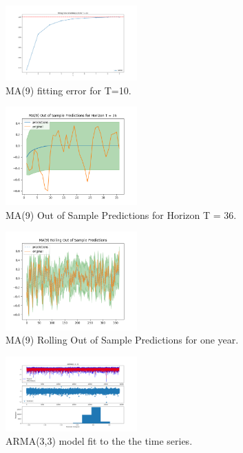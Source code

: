 \documentclass[conference]{IEEEtran}
\begin{document}
\begin{figure}[ht]
    \centering
    \includegraphics[width=0.45\textwidth]{Figures/Fitting Error of ARIMA(0,0,9) for T = 10.png}
    \caption{MA(9) fitting error for T=10.}
    \label{fe9}
\end{figure}

\begin{figure}[ht]
    \centering
    \includegraphics[width=0.45\textwidth]{Figures/MA(9) Out of Sample Predictions for Horizon T = 36.png}
    \caption{MA(9) Out of Sample Predictions for Horizon T = 36.}
    \label{hor9}
\end{figure}
\vspace{40mm}

\begin{figure}[ht]
    \centering
    \includegraphics[width=0.45\textwidth]{Figures/MA(9) Rolling Out of Sample Predictions.png}
    \caption{MA(9) Rolling Out of Sample Predictions for one year.}
    \label{rol9}
\end{figure}
\vspace{30mm}

\begin{figure}[ht]
    \centering
    \includegraphics[width=0.45\textwidth]{Figures/ARIMA(3,0,3).png}
    \caption{ARMA(3,3) model fit to the the time series.}
    \label{ma33}
\end{figure}
\end{document}
